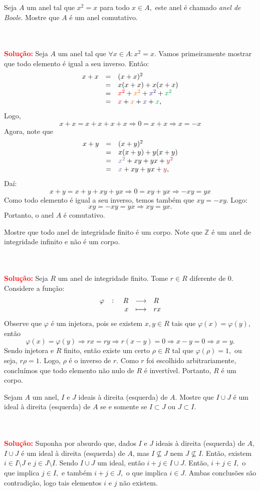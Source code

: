 \documentclass[11pt,a4paper]{article}
\newcounter{exercicio}[section]
\newcommand{\solucao}[1]{
\textbf{\textcolor{white}{oi}\\ \\ \textcolor{red}{Solução:}} #1}
\begin{document}
 Seja $A$ um anel tal que $x^2 = x$ para todo $x \in A,$ este anel é chamado \emph{anel de Boole}. Mostre que $A$ é um anel comutativo.
\solucao{
Seja $A$ um anel tal que $\forall x\in A:x^2=x$. Vamos primeiramente mostrar que todo elemento é igual a seu inverso. Então:
\[
\begin{array}{rcl}
x+x&=&(x+x)^2\\&=&x(x+x)+x(x+x)\\&=&\textcolor{red}{x^2}+\textcolor{Laranja}{x^2}+\textcolor{Blue}{x^2}+\textcolor{Green}{x^2}\\&=&\textcolor{red}{x}+\textcolor{Laranja}{x}+\textcolor{Blue}{x}+\textcolor{Green}{x},
\end{array}
\]
Logo,
\[
x + x = x + x +x +x \Rightarrow 0=x+x \Rightarrow x = -x
\]
Agora, note que
\[
\begin{array}{rcl}
x+y&=&(x+y)^2\\&=&x(x+y)+y(x+y)\\&=&\textcolor{CadetBlue}{x^2}+xy+yx+\textcolor{Mahogany}{y^2}\\&=&\textcolor{CadetBlue}{x}+xy+yx+\textcolor{Mahogany}{y},
\end{array}
\]
Daí:
\[
x + y = x + y + xy + yx \Rightarrow 0=xy+yx \Rightarrow -xy = yx
\]
Como todo elemento é igual a seu inverso, temos também que $xy = -xy.$ Logo:
\[
xy = -xy = yx \Rightarrow xy = yx.
\]
Portanto, o anel $A$ é comutativo.
}

 Mostre que todo anel de integridade finito é um corpo. Note que $\mathbb{Z}$ é um anel de integridade infinito e não é um corpo.
\solucao{
Seja $R$ um anel de integridade finito. Tome $r \in R$ diferente de $0.$ Considere a função:
\[
\fullfunction{\varphi}{R}{R}{x}{rx}
\]
Observe que $\varphi$ é um injetora, pois se existem $x,y \in R$ tais que $\varphi(x) = \varphi(y),$ então
\[
\varphi(x) = \varphi(y) \Rightarrow rx = ry \Rightarrow r(x - y) = 0 \Rightarrow x - y = 0 \Rightarrow x = y.
\]
Sendo injetora e $R$ finito, então existe um certo $\rho \in R$ tal que $\varphi(\rho) = 1,$ ou seja, $r\rho = 1.$ Logo, $\rho$ é o inverso de $r.$ Como $r$ foi escolhido arbitrariamente, concluímos que todo elemento não nulo de $R$ é invertível. Portanto, $R$ é um corpo.
}
 Sejam $A$ um anel, $I$ e $J$ ideais à direita (esquerda) de $A.$ Mostre que $I \cup J$ é um ideal à direita
(esquerda) de $A$ se e somente se $I \subset J$ ou $J \subset I.$
\solucao{Suponha por absurdo que, dados $I$ e $J$ ideais à direita (esquerda) de $A,$ $I \cup J$ é um ideal à direita (esquerda) de $A$, mas $I \nsubseteq J$ nem $J \nsubseteq I.$ Então, existem $i \in I \setminus J$ e $j \in J \setminus I.$ Sendo $I \cup J$ um ideal, então $i+j \in I \cup J.$ Então, $i+j \in I,$ o que implica $j \in I,$ e também $i+j \in J,$ o que implica $i \in J.$ Ambas conclusões são contradição, logo tais elementos $i$ e $j$ não existem.
}
\end{document}
